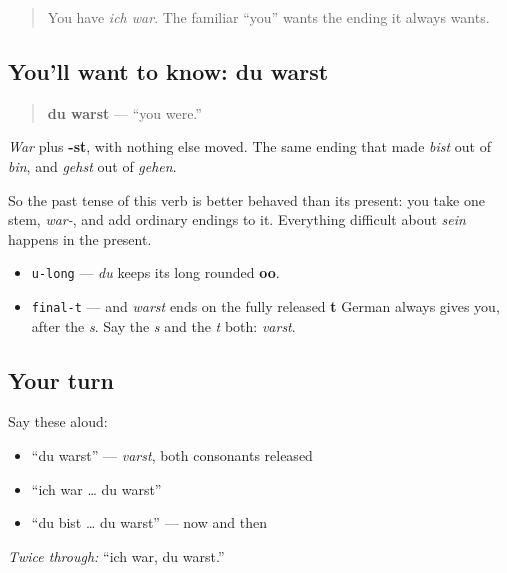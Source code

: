 \label{lesson:GE-C16-du-warst}



\begin{quote}
You have \emph{ich war}. The familiar \textquotedblleft{}you\textquotedblright{} wants the ending it always wants.
\end{quote}

\subsection*{You'll want to know: du warst}
\begin{quote}
\textbf{du warst} — \textquotedblleft{}you were.\textquotedblright{}
\end{quote}

\emph{War} plus \textbf{-st}, with nothing else moved. The same ending that made \emph{bist} out of \emph{bin}, and \emph{gehst} out of \emph{gehen}.

So the past tense of this verb is better behaved than its present: you take one stem, \emph{war-}, and add ordinary endings to it. Everything difficult about \emph{sein} happens in the present.

\begin{sounds}
\begin{itemize}
\raggedright
  \item \texttt{u-long} — \emph{du} keeps its long rounded \textbf{oo}.
  \item \texttt{final-t} — and \emph{warst} ends on the fully released \textbf{t} German always gives you, after the \emph{s}. Say the \emph{s} and the \emph{t} both: \emph{varst}.
\end{itemize}
\end{sounds}

\subsection*{Your turn}
Say these aloud:

\begin{itemize}
\raggedright
  \item \textquotedblleft{}du warst\textquotedblright{} — \emph{varst}, both consonants released
  \item \textquotedblleft{}ich war … du warst\textquotedblright{}
  \item \textquotedblleft{}du bist … du warst\textquotedblright{} — now and then
\end{itemize}

\emph{Twice through:} \textquotedblleft{}ich war, du warst.\textquotedblright{}

